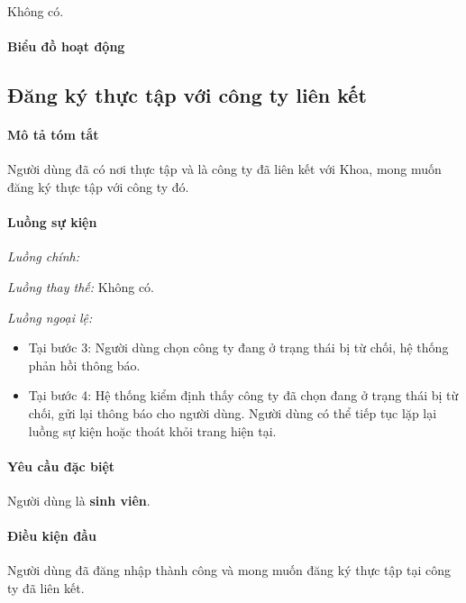 \documentclass[./../main.tex]{subfiles}
\begin{document}
Không có.

\paragraph*{Biểu đồ hoạt động}

\subsection{Đăng ký thực tập với công ty liên kết}

\paragraph*{Mô tả tóm tắt}

Người dùng đã có nơi thực tập và là công ty đã liên kết với Khoa, mong
muốn đăng ký thực tập với công ty đó.

\paragraph*{Luồng sự kiện}

\emph{Luồng chính:}

\emph{Luồng thay thế:} Không có.

\emph{Luồng ngoại lệ:}

\begin{itemize}
\item
  
  Tại bước 3: Người dùng chọn công ty đang ở trạng thái bị từ chối, hệ
  thống phản hồi thông báo.
  
\item
  
  Tại bước 4: Hệ thống kiểm định thấy công ty đã chọn đang ở trạng thái
  bị từ chối, gửi lại thông báo cho người dùng. Người dùng có thể tiếp
  tục lặp lại luồng sự kiện hoặc thoát khỏi trang hiện tại.
  
\end{itemize}

\paragraph*{Yêu cầu đặc biệt}

Người dùng là \textbf{sinh viên}.

\paragraph*{Điều kiện đầu}

Người dùng đã đăng nhập thành công và mong muốn đăng ký thực tập tại
công ty đã liên kết.
\end{document}

